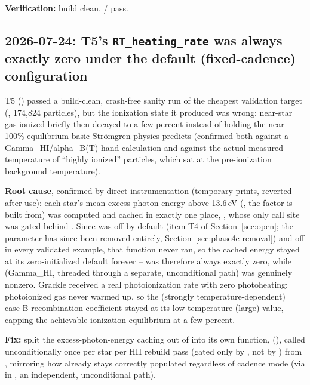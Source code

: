 \textbf{Verification:} build clean, /
 pass.

\subsection{2026-07-24: T5's \texttt{RT\_heating\_rate} was always exactly
zero under the default (fixed-cadence) configuration}
\label{sec:t5-heating-rate-zero}

T5 () passed a build-clean,
crash-free sanity run of the cheapest validation target
(, 174{,}824 particles), but the
ionization state it produced was wrong: near-star gas ionized briefly then
decayed to a few percent instead of holding the near-100\% equilibrium
basic Str\"omgren physics predicts (confirmed both against a
Gamma\_HI/alpha\_B(T) hand calculation and against the actual measured
temperature of ``highly ionized'' particles, which sat at the pre-ionization
background temperature).

\textbf{Root cause}, confirmed by direct instrumentation (temporary
 prints, reverted after use): each star's mean excess
photon energy above 13.6\,eV
(, the
factor  is built from) was computed and cached in
exactly one place,
, whose only
call site was gated behind
. Since
 was off by default (item T4 of
Section~\ref{sec:open}; the parameter has since been removed entirely,
Section~\ref{sec:phase4c-removal}) and off in every validated example,
that function never ran, so
the cached energy stayed at its zero-initialized default forever --
 was therefore always
exactly zero, while  (Gamma\_HI, threaded
through a separate, unconditional path) was genuinely nonzero. Grackle
received a real photoionization rate with zero photoheating: photoionized
gas never warmed up, so the (strongly temperature-dependent) case-B
recombination coefficient stayed at its low-temperature (large) value,
capping the achievable ionization equilibrium at a few percent.

\textbf{Fix:} split the excess-photon-energy caching out of
 into its own
function, 
(), called unconditionally once per star per HII rebuild
pass (gated only by , not by
) from
, mirroring how
 already stays correctly populated
regardless of cadence mode (via 
in , an independent, unconditional path).

